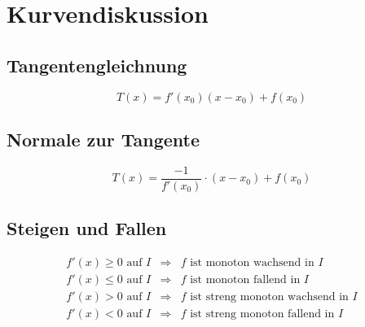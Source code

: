



\section{Kurvendiskussion}

\subsection{Tangentengleichnung}
\label{subsec:tangentengleichung}
\[ \boxed{T(x) = f'(x_0)(x - x_0) + f(x_0)} \]

\subsection{Normale zur Tangente}
\[ \boxed{ T(x) = \frac{-1}{f'(x_0)} \cdot (x-x_0) + f(x_0) } \]

\subsection{Steigen und Fallen}

\[ \boxed{ \begin{array}{lll}
f'(x) \geq 0 \text{ auf } I & \Rightarrow  
& f \text{ ist monoton wachsend in $I$} \\
f'(x) \leq 0 \text{ auf } I & \Rightarrow  
& f \text{ ist monoton fallend in $I$} \\
f'(x) > 0 \text{ auf } I & \Rightarrow  
& f \text{ ist streng monoton wachsend in $I$} \\
f'(x) < 0 \text{ auf } I & \Rightarrow  
& f \text{ ist streng monoton fallend in $I$}
\end{array} } \]

